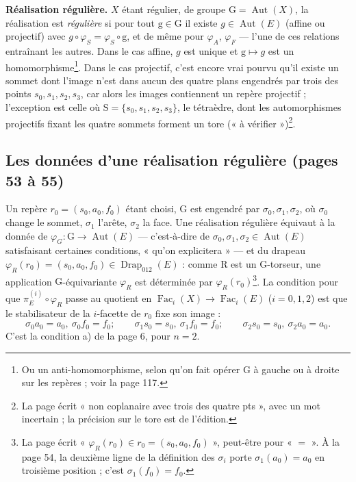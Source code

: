 \documentclass[11pt,a4paper]{article}
\begin{document}
\textbf{Réalisation régulière.} $X$ étant régulier, de groupe $\mathrm{G} =
\operatorname{Aut}(X)$, la réalisation est \emph{régulière} si pour tout
$\mathrm{g} \in \mathrm{G}$ il existe $g \in \operatorname{Aut}(E)$ (affine ou
projectif) avec $g \circ \varphi_S = \varphi_S \circ \mathrm{g}$, et de même pour
$\varphi_A$, $\varphi_F$ --- l'une de ces relations entraînant les autres. Dans le
cas affine, $g$ est unique et $\mathrm{g} \mapsto g$ est un
homomorphisme\footnote{Ou un anti-homomorphisme, selon qu'on fait opérer
$\mathrm{G}$ à gauche ou à droite sur les repères ; voir la page 117.}. Dans le
cas projectif, c'est encore vrai pourvu qu'il existe un sommet dont l'image
n'est dans aucun des quatre plans engendrés par trois des points $s_0, s_1,
s_2, s_3$, car alors les images contiennent un repère projectif ; l'exception
est celle où $\mathrm{S} = \{s_0, s_1, s_2, s_3\}$, le tétraèdre, dont les
automorphismes projectifs fixant les quatre sommets forment un tore (« à
vérifier »)\footnote{La page écrit « non coplanaire avec trois des quatre
pts », avec un mot incertain ; la précision sur le tore est de l'édition.}.

\subsection*{Les données d'une réalisation régulière (pages 53 à 55)}

Un repère $r_0 = (s_0, a_0, f_0)$ étant choisi, $\mathrm{G}$ est engendré par
$\sigma_0, \sigma_1, \sigma_2$, où $\sigma_0$ change le sommet, $\sigma_1$
l'arête, $\sigma_2$ la face. Une réalisation régulière équivaut à la donnée de
$\varphi_G : \mathrm{G} \to \operatorname{Aut}(E)$ --- c'est-à-dire de $\sigma_0,
\sigma_1, \sigma_2 \in \operatorname{Aut}(E)$ satisfaisant certaines conditions,
« qu'on explicitera » --- et du drapeau $\varphi_R(r_0) = (s_0, a_0, f_0) \in
\operatorname{Drap}_{012}(E)$ : comme $\mathrm{R}$ est un $\mathrm{G}$-torseur,
une application $\mathrm{G}$-équivariante $\varphi_R$ est déterminée par
$\varphi_R(r_0)$\footnote{La page écrit « $\varphi_R(r_0) \in r_0 = (s_0, a_0,
f_0)$ », peut-être pour « $= $ ». À la page 54, la deuxième ligne de la
définition des $\sigma_i$ porte $\sigma_1(a_0) = a_0$ en troisième position ;
c'est $\sigma_1(f_0) = f_0$.}. La condition pour que $\pi^{(i)}_E \circ
\varphi_R$ passe au quotient en $\operatorname{Fac}_i(X) \to
\operatorname{Fac}_i(E)$ ($i = 0, 1, 2$) est que le stabilisateur de la
$i$-facette de $r_0$ fixe son image :
\[
\sigma_0 a_0 = a_0,\ \sigma_0 f_0 = f_0 ; \qquad
\sigma_1 s_0 = s_0,\ \sigma_1 f_0 = f_0 ; \qquad
\sigma_2 s_0 = s_0,\ \sigma_2 a_0 = a_0 .
\]
C'est la condition a) de la page 6, pour $n = 2$.
\end{document}
